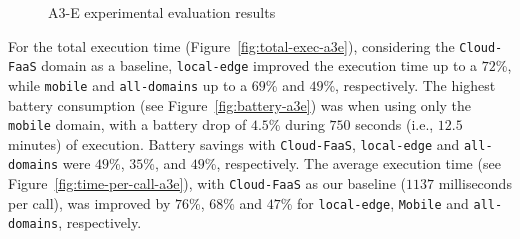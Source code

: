 \begin{figure}[htb]
	\raggedright
	\captionsetup[subfigure]{width=0.33\textwidth}	
	\captionsetup[subfigure]{width=0.33\textwidth}
	\captionsetup[subfigure]{width=0.33\textwidth}
	
	\caption{A3-E experimental evaluation results} \label{fig:exp-a3e}
\end{figure}


For the total execution time (Figure~\ref{fig:total-exec-a3e}), considering the \texttt{Cloud-FaaS} domain as a baseline, \texttt{local-edge} improved the execution time up to a $72$\%, while \texttt{mobile} and \texttt{all-domains} up to a $69$\% and $49$\%, respectively. The highest battery consumption (see Figure~\ref{fig:battery-a3e}) was when using only the \texttt{mobile} domain, with a battery drop of $4.5$\% during $750$ seconds (i.e., $12.5$ minutes) of execution. Battery savings with \texttt{Cloud-FaaS}, \texttt{local-edge} and \texttt{all-domains} were $49$\%, $35$\%, and $49$\%, respectively. The average execution time (see Figure~\ref{fig:time-per-call-a3e}), with \texttt{Cloud-FaaS} as our baseline ($1137$ milliseconds per call), was improved by $76$\%, $68$\% and $47$\% for \texttt{local-edge}, \texttt{Mobile} and \texttt{all-domains}, respectively. 

